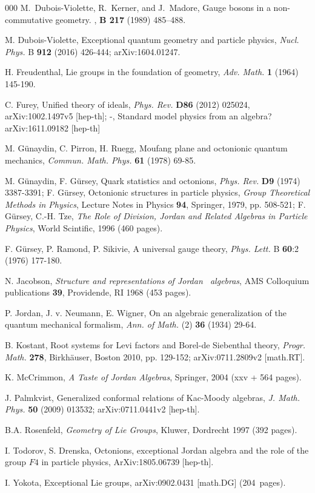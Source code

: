 \documentclass{article}
\begin{document}
\begin{thebibliography}{000}
M.~Dubois-Violette, R.~Kerner, and J.~Madore,
\newblock Gauge bosons in a non-commutative geometry.
, {\bf B 217} (1989) 485--488.

 M. Dubois-Violette, Exceptional quantum geometry and particle 
physics, {\it Nucl. Phys.} B {\bf 912} (2016) 426-444; arXiv:1604.01247.

 H. Freudenthal, Lie groups in the foundation of geometry, 
{\it Adv. Math.} {\bf 1} (1964) 145-190.

 C. Furey, Unified theory of ideals, \textit{Phys. Rev.} \textbf{D86} (2012) 025024, arXiv:1002.1497v5 [hep-th]; -, Standard model physics from an algebra? arXiv:1611.09182 [hep-th]

 M. G\"unaydin, C. Pirron, H. Ruegg, Moufang plane and 
octonionic quantum mechanics, {\it Commun. Math. Phys.} {\bf 61} (1978) 69-85.

 M. G\"unaydin, F. G\"ursey, Quark statistics and octonions, \textit{Phys. Rev.} \textbf{D9} (1974) 3387-3391; F. G\"ursey, Octonionic structures in particle physics, {\it Group Theoretical Methods in Physics}, Lecture Notes in Physics {\bf 94}, Springer, 1979, pp. 508-521; F. G\"ursey, C.-H. Tze, {\it The Role of Division, 
Jordan and Related Algebras in Particle Physics}, World Scintific, 1996 (460 
pages). 

 F. G\"ursey, P. Ramond, P. Sikivie, A universal gauge 
theory, {\it Phys. Lett.} B {\bf 60}:2 (1976) 177-180.

 N. Jacobson, {\it Structure and representations of Jordan \
algebras}, AMS Colloquium publications {\bf 39}, Providende, RI 1968 
(453 pages).

 P. Jordan, J. v. Neumann, E. Wigner, On an algebraic 
generalization of the quantum mechanical formalism, {\it Ann. of Math.} (2) 
{\bf 36} (1934) 29-64.

 B. Kostant, Root systems for Levi factors and Borel-de 
Siebenthal theory, {\it Progr. Math.} {\bf 278}, Birkh\"auser, Boston 2010, pp.
 129-152; arXiv:0711.2809v2 [math.RT].
 
 K. McCrimmon, {\it A Taste of Jordan Algebras}, Springer, 2004 (xxv + 564 pages).

 J. Palmkvist, Generalized conformal relations of Kac-Moody algebras, {\it J. Math. Phys.} {\bf 50} (2009) 013532; arXiv:0711.0441v2 [hep-th].

 B.A. Rosenfeld, {\it Geometry of Lie Groups}, Kluwer, Dordrecht 1997 (392 pages).  

 I. Todorov, S. Drenska, Octonions, exceptional Jordan algebra and the role of the group $F 4$ in particle
physics, ArXiv:1805.06739 [hep-th]. 

 I. Yokota, Exceptional Lie groups, arXiv:0902.0431 [math.DG] (204~pages).

\end{thebibliography}
\end{document}
